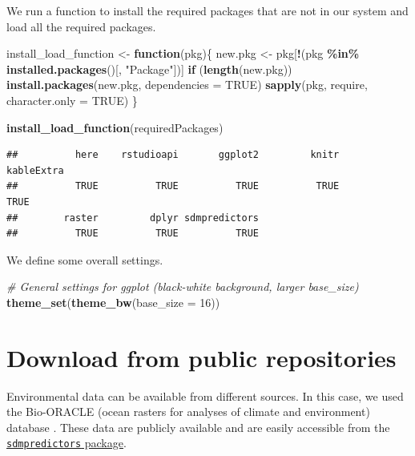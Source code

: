 \documentclass[
]{book}
\newenvironment{Shaded}{\begin{snugshade}}{\end{snugshade}}
\newcommand{\AttributeTok}[1]{\textcolor[rgb]{0.13,0.29,0.53}{#1}}
\newcommand{\CommentTok}[1]{\textcolor[rgb]{0.56,0.35,0.01}{\textit{#1}}}
\newcommand{\ConstantTok}[1]{\textcolor[rgb]{0.56,0.35,0.01}{#1}}
\newcommand{\ControlFlowTok}[1]{\textcolor[rgb]{0.13,0.29,0.53}{\textbf{#1}}}
\newcommand{\DecValTok}[1]{\textcolor[rgb]{0.00,0.00,0.81}{#1}}
\newcommand{\FunctionTok}[1]{\textcolor[rgb]{0.13,0.29,0.53}{\textbf{#1}}}
\newcommand{\NormalTok}[1]{#1}
\newcommand{\OtherTok}[1]{\textcolor[rgb]{0.56,0.35,0.01}{#1}}
\newcommand{\SpecialCharTok}[1]{\textcolor[rgb]{0.81,0.36,0.00}{\textbf{#1}}}
\newcommand{\StringTok}[1]{\textcolor[rgb]{0.31,0.60,0.02}{#1}}
\begin{document}
We run a function to install the required packages that are not in our system and load all the required packages.

\begin{Shaded}
\begin{Highlighting}[]
\NormalTok{install\_load\_function }\OtherTok{\textless{}{-}} \ControlFlowTok{function}\NormalTok{(pkg)\{}
\NormalTok{  new.pkg }\OtherTok{\textless{}{-}}\NormalTok{ pkg[}\SpecialCharTok{!}\NormalTok{(pkg }\SpecialCharTok{\%in\%} \FunctionTok{installed.packages}\NormalTok{()[, }\StringTok{"Package"}\NormalTok{])]}
  \ControlFlowTok{if}\NormalTok{ (}\FunctionTok{length}\NormalTok{(new.pkg))}
    \FunctionTok{install.packages}\NormalTok{(new.pkg, }\AttributeTok{dependencies =} \ConstantTok{TRUE}\NormalTok{)}
  \FunctionTok{sapply}\NormalTok{(pkg, require, }\AttributeTok{character.only =} \ConstantTok{TRUE}\NormalTok{)}
\NormalTok{\}}

\FunctionTok{install\_load\_function}\NormalTok{(requiredPackages)}
\end{Highlighting}
\end{Shaded}

\begin{verbatim}
##          here    rstudioapi       ggplot2         knitr    kableExtra 
##          TRUE          TRUE          TRUE          TRUE          TRUE 
##        raster         dplyr sdmpredictors 
##          TRUE          TRUE          TRUE
\end{verbatim}

We define some overall settings.

\begin{Shaded}
\begin{Highlighting}[]
\CommentTok{\# General settings for ggplot (black{-}white background, larger base\_size)}
\FunctionTok{theme\_set}\NormalTok{(}\FunctionTok{theme\_bw}\NormalTok{(}\AttributeTok{base\_size =} \DecValTok{16}\NormalTok{))}
\end{Highlighting}
\end{Shaded}

\section{Download from public repositories}\label{download-from-public-repositories}

Environmental data can be available from different sources. In this case, we used the Bio-ORACLE (ocean
rasters for analyses of climate and environment) database \citep{tyberghein_etal_2012, assis_etal_2017}. These data are publicly available and are easily accessible from the \href{https://cran.r-project.org/web/packages/sdmpredictors/index.html}{\texttt{sdmpredictors} package}.
\end{document}
